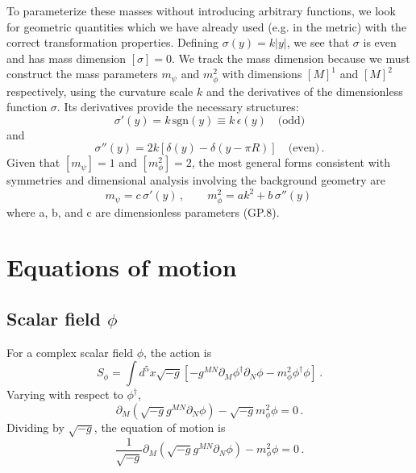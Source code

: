 \documentclass[11pt]{article}
\begin{document}
To parameterize these masses without introducing arbitrary functions, we look for geometric quantities which we have already used (e.g. in the metric) with the correct transformation properties. Defining $\sigma(y) = k|y|$, we see that $\sigma$ is even and has mass dimension $[\sigma]=0$. We track the mass dimension because we must construct the mass parameters $m_\psi$ and $m_\phi^2$ with dimensions $[M]^1$ and $[M]^2$ respectively, using the curvature scale $k$ and the derivatives of the dimensionless function $\sigma$. Its derivatives provide the necessary structures:
\begin{equation}
\sigma'(y) = k \, \text{sgn}(y) \equiv k \, \epsilon(y) \quad \text{(odd)}
\end{equation}
and
\begin{equation}
\sigma''(y) = 2k[\delta(y) - \delta(y-\pi R)] \quad \text{(even)} \, .
\end{equation}
Given that $[m_\psi]=1$ and $[m_\phi^2]=2$, the most general forms consistent with symmetries and dimensional analysis involving the background geometry are
\begin{equation}
m_\psi = c \, \sigma'(y) \, , \qquad
m_\phi^2 = a k^2 + b \, \sigma''(y) \,
\end{equation}
where a, b, and c are dimensionless parameters (GP.8).

\section{Equations of motion}

\subsection{Scalar field $\phi$}
For a complex scalar field $\phi$, the action is
\begin{equation}
S_\phi = \int d^5x \sqrt{-g} \left[ - g^{MN} \partial_M \phi^\dagger \partial_N \phi - m_\phi^2 \phi^\dagger \phi \right] \, .
\end{equation}
Varying with respect to $\phi^\dagger$,
\begin{equation}
\partial_M \left( \sqrt{-g} g^{MN} \partial_N \phi \right) - \sqrt{-g} m_\phi^2 \phi = 0 \, .
\end{equation}
Dividing by $\sqrt{-g}$, the equation of motion is
\begin{equation}
\frac{1}{\sqrt{-g}} \partial_M \left( \sqrt{-g} g^{MN} \partial_N \phi \right) - m_\phi^2 \phi = 0 \, .
\end{equation}
\end{document}
